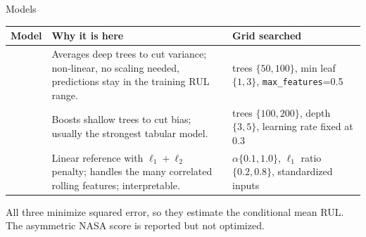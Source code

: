 \documentclass[aspectratio=169,11pt]{beamer}
\begin{document}
\begin{frame}{Models}
  \small
  \begin{tabular}{>{\raggedright\arraybackslash}p{}>{\raggedright\arraybackslash}p{}>{\raggedright\arraybackslash}p{}}
    \toprule
    Model & Why it is here & Grid searched \\
    \midrule
    {\color{rf}\textbf{Random Forest}} &
      Averages deep trees to cut variance; non-linear, no scaling needed,
      predictions stay in the training RUL range. &
      trees $\{50,100\}$, min leaf $\{1,3\}$, \texttt{max\_features}=0.5 \\ \addlinespace[0.6em]
    {\color{xgb}\textbf{XGBoost}} &
      Boosts shallow trees to cut bias; usually the strongest tabular model. &
      trees $\{100,200\}$, depth $\{3,5\}$, learning rate fixed at 0.3 \\ \addlinespace[0.6em]
    {\color{enet}\textbf{Elastic Net}} &
      Linear reference with $\ell_1+\ell_2$ penalty; handles the many
      correlated rolling features; interpretable. &
      $\alpha\{0.1,1.0\}$, $\ell_1$ ratio $\{0.2,0.8\}$, standardized inputs \\
    \bottomrule
  \end{tabular}
  \vspace{0.6em}

  All three minimize squared error, so they estimate the conditional mean RUL.
  The asymmetric NASA score is reported but not optimized.
\end{frame}
\end{document}
